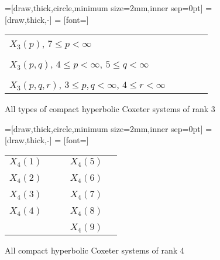 \begin{figure}
	\centering
	=[draw,thick,circle,minimum size=2mm,inner sep=0pt]
	 = [draw,thick,-]
	 = [font=\small]

	\begin{tabular}{MMcMM}
		$X_3(p)$, {\tiny $7 \leq p < \infty$} & \comphyperthreeone \\ \vspace*{\cgpadv} \\
		$X_3(p,q)$, {\tiny $4 \leq p < \infty$, $5 \leq q < \infty$} & \comphyperthreetwo \\ \vspace*{\cgpadv} \\
		$X_3(p,q,r)$, {\tiny $3 \leq p,q < \infty$, $4 \leq r < \infty$} & \comphyperthreethree
	\end{tabular}
	\caption{All types of compact hyperbolic Coxeter systems of rank 3}
	\label{fig:compact-hyperbolic-coxeter-systems-3}
\end{figure}

\begin{figure}
	\centering
	=[draw,thick,circle,minimum size=2mm,inner sep=0pt]
	 = [draw,thick,-]
	 = [font=\small]

	\begin{tabular}{MMcMM}
		$X_4(1)$ & \comphyperfourlineone & \hspace*{\cgpadh} & $X_4(5)$ & \comphyperfoursquareone \\ \vspace*{\cgpadv} \\
		$X_4(2)$ & \comphyperfourlinetwo & \hspace*{\cgpadh} & $X_4(6)$ & \comphyperfoursquaretwo \\ \vspace*{\cgpadv} \\
		$X_4(3)$ & \comphyperfourlinethree & \hspace*{\cgpadh} & $X_4(7)$ & \comphyperfoursquarethree \\ \vspace*{\cgpadv} \\
		$X_4(4)$ & \comphyperfourlinefour & \hspace*{\cgpadh} & $X_4(8)$ & \comphyperfoursquarefour \\ \vspace*{\cgpadv} \\
		& & & $X_4(9)$ & \comphyperfoursquarefive
	\end{tabular}
	\caption{All compact hyperbolic Coxeter systems of rank 4}
	\label{fig:compact-hyperbolic-coxeter-systems-4}
\end{figure}

